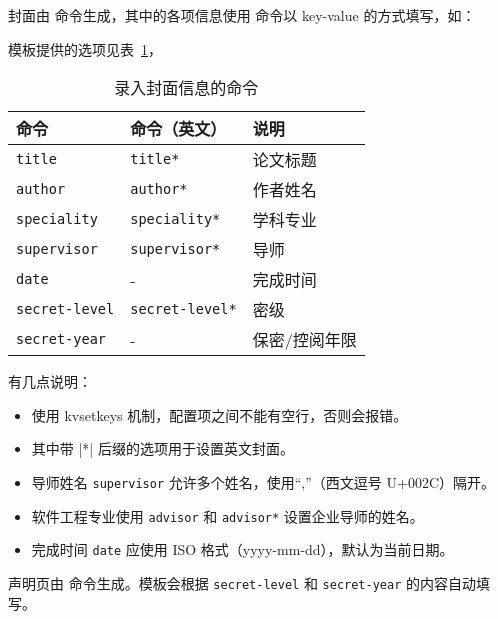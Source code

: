 \documentclass[a4paper]{ltxdoc}
\DeclareRobustCommand\pkg{\textsf}
\DeclareRobustCommand\opt{\texttt}
\begin{document}
\DescribeMacro{\maketitle}
封面由  命令生成，其中的各项信息使用  命令以
key-value 的方式填写，如：
\begin{latex}
\end{latex}
模板提供的选项见表~\ref{tab:covercmds}，
\begin{table}[htb]
  \centering\small
  \caption{录入封面信息的命令}
  \label{tab:covercmds}
  \begin{tabular}{lll}
    \toprule
    命令               & 命令（英文）        & 说明          \\
    \midrule
    \opt{title}        & \opt{title*}        & 论文标题      \\
    \opt{author}       & \opt{author*}       & 作者姓名      \\
    \opt{speciality}   & \opt{speciality*}   & 学科专业      \\
    \opt{supervisor}   & \opt{supervisor*}   & 导师      \\
    \opt{date}         & -                   & 完成时间      \\
    \opt{secret-level} & \opt{secret-level*} & 密级          \\
    \opt{secret-year}  & -                   & 保密/控阅年限 \\
    \bottomrule
  \end{tabular}
\end{table}

有几点说明：
\begin{itemize}
  \item {} 使用 \pkg{kvsetkeys} 机制，配置项之间不能有空行，否则会报错。
  \item 其中带 |*| 后缀的选项用于设置英文封面。
  \item 导师姓名 \opt{supervisor} 允许多个姓名，使用“,”（西文逗号 U+002C）隔开。
  \item 软件工程专业使用 \opt{advisor} 和 \opt{advisor*} 设置企业导师的姓名。
  \item 完成时间 \opt{date} 应使用 ISO 格式（yyyy-mm-dd），默认为当前日期。
\end{itemize}

\DescribeMacro{\copyrightpage}
声明页由  命令生成。模板会根据 \opt{secret-level} 和
\opt{secret-year} 的内容自动填写。
\end{document}
